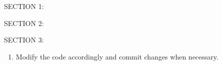 \documentclass[letterpaper,10pt,english]{sphinxmanual}
\begin{document}
SECTION 1:


SECTION 2:


SECTION 3:

\begin{enumerate}
%
\setcounter{enumi}{3}
\item {} 
Modify the code accordingly and commit changes when necessary.

\end{enumerate}
\end{document}
